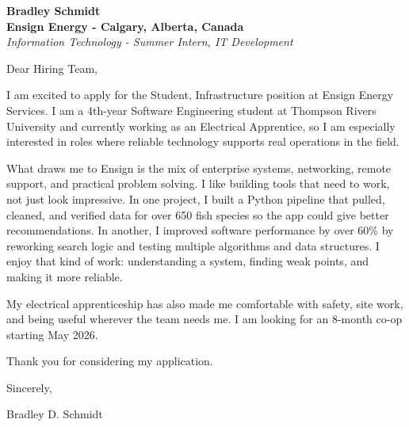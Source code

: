 \documentclass[11pt]{article}
\begin{document}
\textbf{Bradley Schmidt}\\
\vspace{0.5em}
\textbf{Ensign Energy - Calgary, Alberta, Canada}\\
\textit{Information Technology - Summer Intern, IT Development}

Dear Hiring Team,

\par

I am excited to apply for the Student, Infrastructure position at Ensign Energy Services. I am a 4th-year Software Engineering student at Thompson Rivers University and currently working as an Electrical Apprentice, so I am especially interested in roles where reliable technology supports real operations in the field.

\par

What draws me to Ensign is the mix of enterprise systems, networking, remote support, and practical problem solving. I like building tools that need to work, not just look impressive. In one project, I built a Python pipeline that pulled, cleaned, and verified data for over 650 fish species so the app could give better recommendations. In another, I improved software performance by over 60\% by reworking search logic and testing multiple algorithms and data structures. I enjoy that kind of work: understanding a system, finding weak points, and making it more reliable.

\par

My electrical apprenticeship has also made me comfortable with safety, site work, and being useful wherever the team needs me. I am looking for an 8-month co-op starting May 2026.

\par

Thank you for considering my application.

\par

Sincerely,

\par

Bradley D. Schmidt
\end{document}
